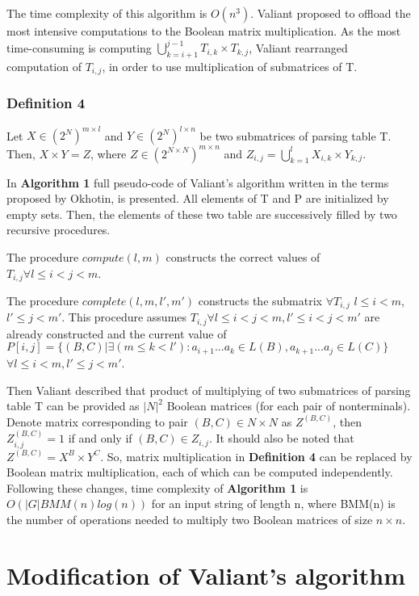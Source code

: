\documentclass[runningheads]{llncs}
\begin{document}
The time complexity of this algorithm is $O(n^3)$. Valiant proposed to offload the most intensive computations to the Boolean matrix multiplication. As the most time-consuming is computing $\bigcup\limits_{k = i + 1}^{j - 1} T_{i, k} \times T_{k, j}$, Valiant rearranged computation of $T_{i, j}$, in order to use multiplication of submatrices of T. 

\subsubsection{Definition 4} Let $X \in (2^N)^{m \times l}$ and $Y \in (2^N)^{l \times n}$ be two submatrices of parsing table T. Then, $X \times Y = Z$, where $Z \in (2^{N \times N})^{m \times n}$ and $Z_{i, j} = \bigcup\limits_{k = 1}^{l} X_{i, k} \times Y_{k, j}$.

In \textbf{Algorithm 1} full pseudo-code of Valiant's algorithm written in the terms proposed by Okhotin, is presented. All elements of T and P are initialized by empty sets. Then, the elements of these two table are successively filled by two recursive procedures.

The procedure $compute(l, m)$ constructs the correct values of $T_{i,j} \forall l \le i < j < m$.

The procedure $complete(l, m, l', m')$ constructs the submatrix $\forall T_{i, j}$ $l \le i < m$, $l' \le j < m'$. This procedure assumes $T_{i, j} \forall l \leq i < j < m,  l' \leq i < j < m'$ are already constructed and the current value of  $P[i, j] =  \{ (B, C) |\exists (m \le k < l'): a_{i + 1}...a_{k} \in L(B), a_{k + 1}...a_{j} \in L(C)\}$ $\forall l \leq i < m,  l' \leq j < m'$. 

Then Valiant described that product of multiplying of two submatrices of parsing table T can be provided as $|N|^2$ Boolean matrices (for each pair of nonterminals). Denote matrix corresponding to pair $(B, C) \in N \times N$ as $Z^{(B, C)}$, then $Z_{i, j}^{(B, C)} = 1$ if and only if $(B, C) \in Z_{i, j}$. It should also be noted that $Z^{(B, C)} = X^{B} \times Y^{C}$. So, matrix multiplication in \textbf{Definition 4} can be replaced by Boolean matrix multiplication, each of which can be computed independently. Following these changes, time complexity of \textbf{Algorithm 1} is $O(|G|BMM(n)log(n))$ for an input string of length n, where BMM(n) is the number of operations needed to multiply two Boolean matrices of size $n \times n$.

\section{Modification of Valiant's algorithm}
 
\end{document}
